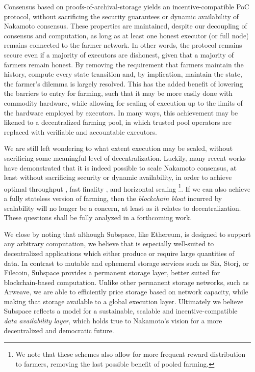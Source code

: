 \documentclass[conference]{IEEEtran}
\begin{document}
Consensus based on proofs-of-archival-storage yields an incentive-compatible PoC protocol, without sacrificing the security guarantees or dynamic availability of Nakamoto consensus. These properties are maintained, despite our decoupling of consensus and computation, as long as at least one honest executor (or full node) remains connected to the farmer network. In other words, the protocol remains secure even if a majority of executors are dishonest, given that a majority of farmers remain honest. By removing the requirement that farmers maintain the history, compute every state transition and, by implication, maintain the state, the farmer’s dilemma is largely resolved. This has the added benefit of lowering the barriers to entry for farming, such that it may be more easily done with commodity hardware, while allowing for scaling of execution up to the limits of the hardware employed by executors. In many ways, this achievement may be likened to a decentralized farming pool, in which trusted pool operators are replaced with verifiable and accountable executors. 

We are still left wondering to what extent execution may be scaled, without sacrificing some meaningful level of decentralization. Luckily, many recent works have demonstrated that it is indeed possible to scale Nakamoto consensus, at least without sacrificing security or dynamic availability, in order to achieve optimal throughput \cite{bagaria2019prism}, fast finality \cite{li2020taiji}, and horizontal scaling \cite{rana2020free2shard}\footnote{We note that these schemes also allow for more frequent reward distribution to farmers, removing the last possible benefit of pooled farming.}. If we can also achieve a fully stateless version of farming, then the \textit{blockchain bloat} incurred by scalability will no longer be a concern, at least as it relates to decentralization. These questions shall be fully analyzed in a forthcoming work.

We close by noting that although Subspace, like Ethereum, is designed to support any arbitrary computation, we believe that is especially well-suited to decentralized applications which either produce or require large quantities of data. In contrast to mutable and ephemeral storage services such as Sia\cite{vorick2014sia}, Storj\cite{wilkinson2014storj}, or Filecoin\cite{benet2018filecoin}, Subspace provides a permanent storage layer, better suited for blockchain-based computation. Unlike other permanent storage networks, such as Arweave\cite{williams2019arweave}, we are able to efficiently price storage based on network capacity, while making that storage available to a global execution layer. Ultimately we believe Subspace reflects a model for a sustainable, scalable and incentive-compatible \textit{data availability layer}, which holds true to Nakamoto’s vision for a more decentralized and democratic future.

\end{document}
